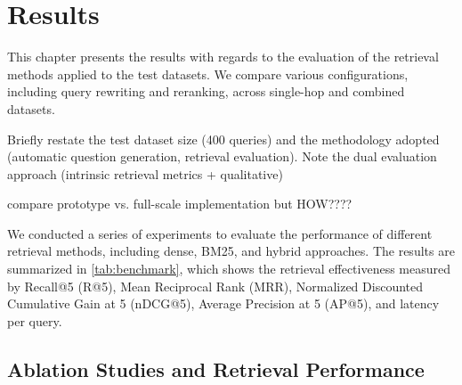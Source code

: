 \chapter{Results}
\label{chap:results}
\begin{spacing}{1.5}

This chapter presents the results with regards to the evaluation of the retrieval methods applied to the test datasets. We compare various configurations, including query rewriting and reranking, across single-hop and combined datasets.

Briefly restate the test dataset size (400 queries) and the methodology adopted (automatic question generation, retrieval evaluation).
Note the dual evaluation approach (intrinsic retrieval metrics + qualitative)

compare prototype vs. full-scale implementation but HOW????

We conducted a series of experiments to evaluate the performance of different retrieval methods, including dense, BM25, and hybrid approaches. The results are summarized in \autoref{tab:benchmark}, which shows the retrieval effectiveness measured by Recall@5 (R@5), Mean Reciprocal Rank (MRR), Normalized Discounted Cumulative Gain at 5 (nDCG@5), Average Precision at 5 (AP@5), and latency per query.


\section{Ablation Studies and Retrieval Performance}\label{sec:retrieval_ablation}



\end{spacing}
